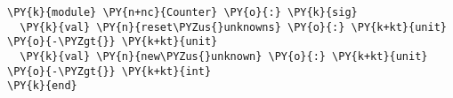 \begin{Verbatim}[commandchars=\\\{\}]
\PY{k}{module} \PY{n+nc}{Counter} \PY{o}{:} \PY{k}{sig}
  \PY{k}{val} \PY{n}{reset\PYZus{}unknowns} \PY{o}{:} \PY{k+kt}{unit} \PY{o}{-\PYZgt{}} \PY{k+kt}{unit}
  \PY{k}{val} \PY{n}{new\PYZus{}unknown} \PY{o}{:} \PY{k+kt}{unit} \PY{o}{-\PYZgt{}} \PY{k+kt}{int}
\PY{k}{end}
\end{Verbatim}
